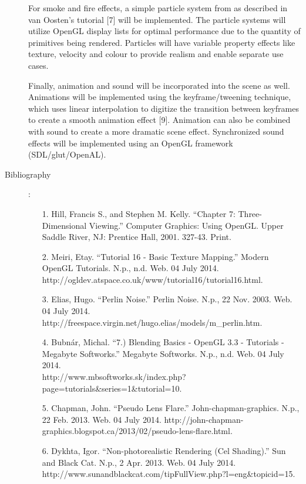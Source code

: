 \documentclass {article}
\begin{document}
\begin{description}
    For smoke and fire effects, a simple particle system from as described in van Oosten’s tutorial [7] will be implemented. The particle systems will utilize OpenGL display lists for optimal performance due to the quantity of primitives being rendered. Particles will have variable property effects like texture, velocity and colour to provide realism and enable separate use cases.

    Finally, animation and sound will be incorporated into the scene as well. Animations will be implemented using the keyframe/tweening technique, which uses linear interpolation to digitize the transition between keyframes to create a smooth animation effect [9].
    Animation can also be combined with sound to create a more dramatic scene effect. Synchronized sound effects will be implemented using an OpenGL framework (SDL/glut/OpenAL).
\newpage
\item[Bibliography]:\\

\begin{enumerate}
    \item[1.] Hill, Francis S., and Stephen M. Kelly. ``Chapter 7: Three-Dimensional Viewing.'' Computer Graphics: Using OpenGL. Upper Saddle River, NJ: Prentice Hall, 2001. 327-43. Print.

    \item[2.] Meiri, Etay. ``Tutorial 16 - Basic Texture Mapping.'' Modern OpenGL Tutorials. N.p., n.d. Web. 04 July 2014. http://ogldev.atspace.co.uk/www/tutorial16/tutorial16.html.

    \item[3.] Elias, Hugo. ``Perlin Noise.'' Perlin Noise. N.p., 22 Nov. 2003. Web. 04 July 2014.
    \\ http://freespace.virgin.net/hugo.elias/models/m\_perlin.htm.

    \item[4.] Bubnár, Michal. ``7.) Blending Basics - OpenGL 3.3 - Tutorials - Megabyte Softworks.'' Megabyte Softworks. N.p., n.d. Web. 04 July 2014.
    \\ http://www.mbsoftworks.sk/index.php?page=tutorials\&series=1\&tutorial=10.

    \item[5.] Chapman, John. ``Pseudo Lens Flare.'' John-chapman-graphics. N.p., 22 Feb. 2013. Web. 04 July 2014. http://john-chapman-graphics.blogspot.ca/2013/02/pseudo-lens-flare.html.

    \item[6.] Dykhta, Igor. ``Non-photorealistic Rendering (Cel Shading).'' Sun and Black Cat. N.p., 2 Apr. 2013. Web. 04 July 2014. http://www.sunandblackcat.com/tipFullView.php?l=eng\&topicid=15.


\end{enumerate}
\end{description}
\end{document}
